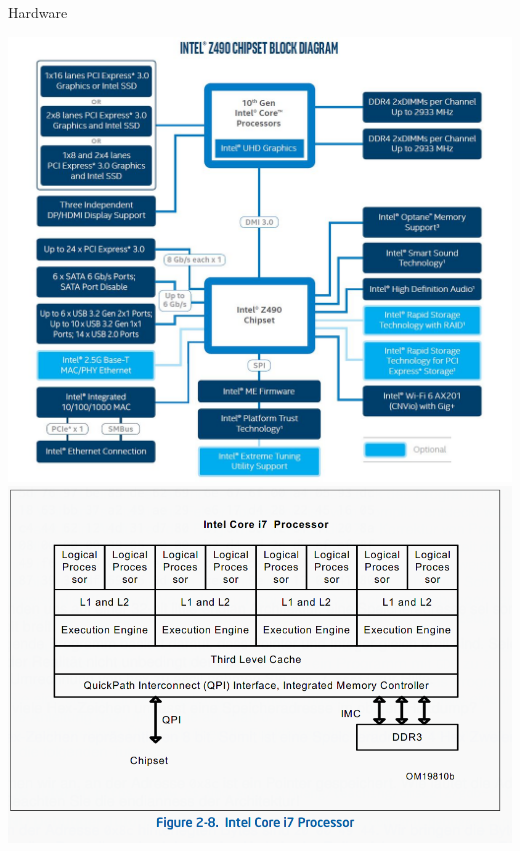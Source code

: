 \documentclass[10pt]{beamer}
\begin{document}
\begin{frame}[allowframebreaks]{Hardware}
\begin{center}
    \includegraphics[keepaspectratio, width=\textwidth, height=\textheight-2\baselineskip-2\baselineskip]{img/001_chipset.jpg} \\ \framebreak
    \includegraphics[keepaspectratio, width=\textwidth, height=\textheight-2\baselineskip-2\baselineskip]{img/001_i7.png} \\ \framebreak

\end{center}
\end{frame}
\end{document}
